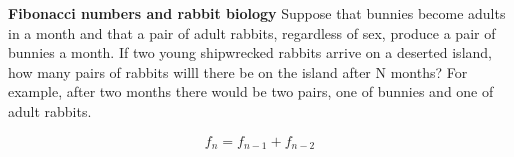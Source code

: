 \documentclass[nochap]{config/ejercicios}
\begin{document}
\begin{problemS} \textbf{Fibonacci numbers and rabbit biology}
Suppose that bunnies become adults in a month and that a pair of adult rabbits, regardless of sex, produce a pair of bunnies a month. If two young shipwrecked rabbits arrive on a deserted island, how many pairs of rabbits willl there be on the island after N months? For example, after two months there would be two pairs, one of bunnies and one of adult rabbits. 

$$f_n = f_{n-1} + f_{n-2}$$
\end{problemS}
\end{document}
